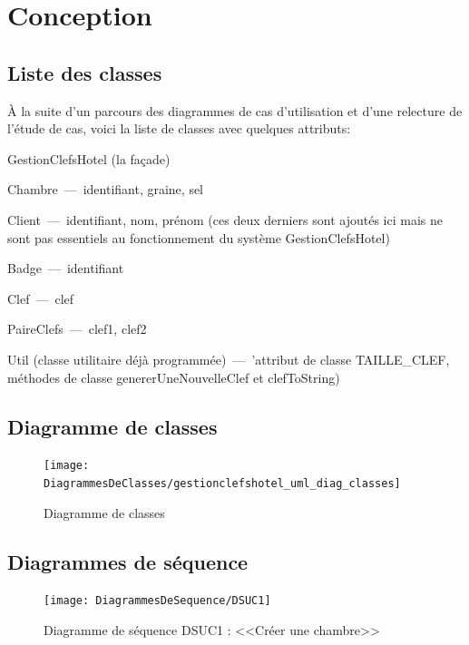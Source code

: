 \documentclass[11pt,article]{article}
\begin{document}
\section{Conception}

\subsection{Liste des classes}

À la suite d'un parcours des diagrammes de cas d'utilisation et d'une
relecture de l'étude de cas, voici la liste de classes avec quelques
attributs:
\begin{compactitem}
\item \textsf{GestionClefsHotel} (la façade)
\item \textsf{Chambre}~---~identifiant, graine, sel
\item \textsf{Client}~---~identifiant, nom, prénom (ces deux derniers
  sont ajoutés ici mais ne sont pas essentiels au fonctionnement du
  système \textsf{GestionClefsHotel})
\item \textsf{Badge}~---~identifiant
\item \textsf{Clef}~---~clef
\item \textsf{PaireClefs}~---~clef1, clef2
\item \textsf{Util} (classe utilitaire déjà programmée)~---~'attribut
  de classe \textsf{TAILLE\_CLEF}, méthodes de classe
  \textsf{genererUneNouvelleClef} et \textsf{clefToString})
\end{compactitem}
\newpage

\subsection{Diagramme de classes}

\begin{figure}[h!]
  \texttt{[image: DiagrammesDeClasses/gestionclefshotel\_uml\_diag\_classes]}
  \caption{Diagramme de classes}
  \label{umlet_diag_classes}
\end{figure}

\newpage

\subsection{Diagrammes de séquence}

\begin{figure}[h!]
  \texttt{[image: DiagrammesDeSequence/DSUC1]}
  \caption{Diagramme de séquence DSUC1 : <<Créer une chambre>>}
  \label{umlet_diag_seq1}
\end{figure}
\end{document}

